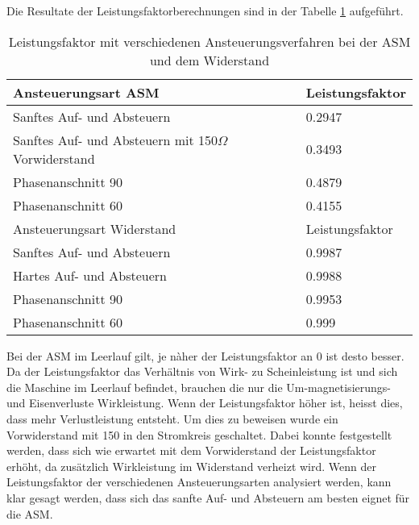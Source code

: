 Die Resultate der Leistungsfaktorberechnungen sind in der Tabelle \ref{tab:Leistungsfaktor_ASM_Widerstand} aufgeführt.

\begin{table}[ht!]
	\centering
	\begin{tabular}{|l|l|}
		\hline
		Ansteuerungsart ASM                                   		& Leistungsfaktor \\ \hline 
		Sanftes Auf- und Absteuern                          		& 0.2947          \\ \hline
		Sanftes Auf- und Absteuern mit 150$\Omega$ Vorwiderstand 	& 0.3493          \\ \hline
		Phasenanschnitt 90\textdegree                               & 0.4879          \\ \hline
		Phasenanschnitt 60\textdegree                               & 0.4155          \\ \hline \hline
		Ansteuerungsart Widerstand                            		& Leistungsfaktor \\ \hline 
		Sanftes Auf- und Absteuern                          		& 0.9987          \\ \hline
		Hartes Auf- und Absteuern                                   & 0.9988          \\ \hline
		Phasenanschnitt 90\textdegree                         		& 0.9953          \\ \hline
		Phasenanschnitt 60\textdegree                         		& 0.999           \\ \hline
	\end{tabular}
\caption{Leistungsfaktor mit verschiedenen Ansteuerungsverfahren bei der ASM und dem Widerstand}\label{tab:Leistungsfaktor_ASM_Widerstand}
\end{table}
Bei der ASM im Leerlauf gilt, je nàher der Leistungsfaktor an 0 ist desto besser. Da der Leistungsfaktor das Verhältnis von Wirk- zu Scheinleistung ist und sich die Maschine im Leerlauf befindet, brauchen die nur die Um-magnetisierungs- und Eisenverluste Wirkleistung. Wenn der Leistungsfaktor höher ist, heisst dies, dass mehr Verlustleistung entsteht. Um dies zu beweisen wurde ein Vorwiderstand mit \SI{150}{\Omega} in den Stromkreis geschaltet. Dabei konnte festgestellt werden, dass sich wie erwartet mit dem Vorwiderstand der Leistungsfaktor erhöht, da zusätzlich Wirkleistung im Widerstand verheizt wird. Wenn der Leistungsfaktor der verschiedenen Ansteuerungsarten analysiert werden, kann klar gesagt werden, dass sich das sanfte Auf- und  Absteuern am besten eignet für die ASM.

